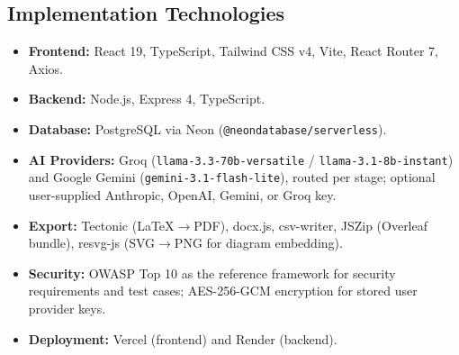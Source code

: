 \documentclass[12pt,a4paper,oneside]{report}
\begin{document}
\subsection{Implementation Technologies}
\begin{itemize}[leftmargin=*,nosep]
  \item \textbf{Frontend:} React 19, TypeScript, Tailwind CSS v4, Vite, React Router 7, Axios.
  \item \textbf{Backend:} Node.js, Express 4, TypeScript.
  \item \textbf{Database:} PostgreSQL via Neon (\texttt{@neondatabase/serverless}).
  \item \textbf{AI Providers:} Groq (\texttt{llama-3.3-70b-versatile} / \texttt{llama-3.1-8b-instant}) and Google Gemini (\texttt{gemini-3.1-flash-lite}), routed per stage; optional user-supplied Anthropic, OpenAI, Gemini, or Groq key.
  \item \textbf{Export:} Tectonic (LaTeX$\rightarrow$PDF), docx.js, csv-writer, JSZip (Overleaf bundle), resvg-js (SVG$\rightarrow$PNG for diagram embedding).
  \item \textbf{Security:} OWASP Top 10 as the reference framework for security requirements and test cases; AES-256-GCM encryption for stored user provider keys.
  \item \textbf{Deployment:} Vercel (frontend) and Render (backend).
\end{itemize}
\end{document}
